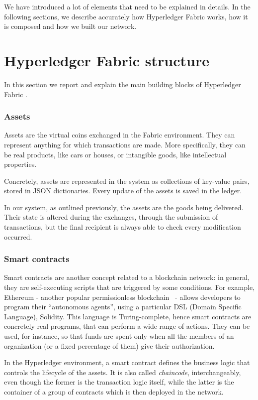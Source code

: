 We have introduced a lot of elements that need to be explained in details. In the following sections, we describe accurately how Hyperledger Fabric works, how it is composed and how we built our network.

\section{Hyperledger Fabric structure}
\label{sec:fabric_structure}
In this section we report and explain the main building blocks of Hyperledger Fabric \cite{hyperledger_paper}.

\subsubsection{Assets}
Assets are the virtual coins exchanged in the Fabric environment. They can represent anything for which transactions are made. More specifically, they can be real products, like cars or houses, or intangible goods, like intellectual properties.

Concretely, assets are represented in the system as collections of key-value pairs, stored in JSON dictionaries. Every update of the assets is saved in the ledger.

In our system, as outlined previously, the assets are the goods being delivered. Their state is altered during the exchanges, through the submission of transactions, but the final recipient is always able to check every modification occurred.

\subsubsection{Smart contracts}
Smart contracts are another concept related to a blockchain network: in general, they are self-executing scripts that are triggered by some conditions. For example, Ethereum - another popular permissionless blockchain~\cite{ethereum} - allows developers to program their ``autonomous agents'', using a particular DSL (Domain Specific Language), Solidity. This language is Turing-complete, hence smart contracts are concretely real programs, that can perform a wide range of actions. They can be used, for instance, so that funds are spent only when all the members of an organization (or a fixed percentage of them) give their authorization. 

In the Hyperledger environment, a smart contract defines the business logic that controls the lifecycle of the assets. It is also called \emph{chaincode}, interchangeably, even though the former is the transaction logic itself, while the latter is the container of a group of contracts which is then deployed in the network. 

